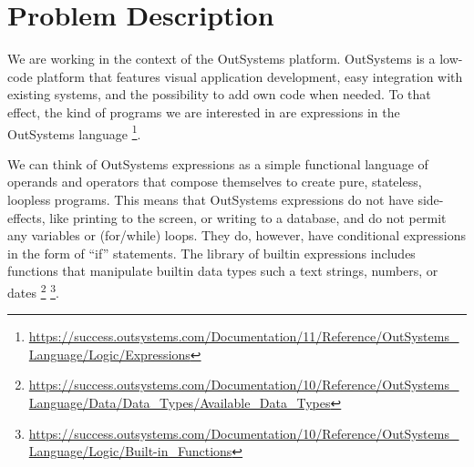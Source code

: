 \section{Problem Description}
\label{sec:problem-description}

We are working in the context of the OutSystems platform. OutSystems is a
low-code platform that features visual application development, easy integration
with existing systems, and the possibility to add own code when needed. To that
effect, the kind of programs we are interested in are expressions in the
OutSystems language
\footnote{\url{https://success.outsystems.com/Documentation/11/Reference/OutSystems_Language/Logic/Expressions}}.

We can think of OutSystems expressions as a simple functional language of
operands and operators that compose themselves to create pure, stateless,
loopless programs. This means that OutSystems expressions do not have
side-effects, like printing to the screen, or writing to a database, and do not
permit any variables or (for/while) loops. They do, however, have conditional
expressions in the form of ``if'' statements. The library of builtin expressions
includes functions that manipulate builtin data types such a text strings,
numbers, or dates
\footnote{\url{https://success.outsystems.com/Documentation/10/Reference/OutSystems_Language/Data/Data_Types/Available_Data_Types}}
\footnote{\url{https://success.outsystems.com/Documentation/10/Reference/OutSystems_Language/Logic/Built-in_Functions}}.

